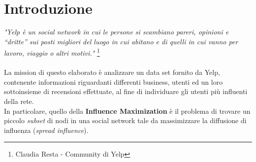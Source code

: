 
\chapter{Introduzione}
\textit{"Yelp è un social network in cui le persone si
scambiano pareri,  opinioni e “dritte” sui posti migliori del luogo in cui
abitano e di  quelli in cui vanno per lavoro, viaggio o altri motivi."}
\footnote{Claudia Resta - Community di Yelp}\\\\
La mission di questo elaborato è
analizzare un data set fornito da Yelp,  contenente informazioni riguardanti
differenti business, utenti ed un  loro sottoinsieme di recensioni effettuate,
al fine di individuare gli  utenti più influenti della rete.\\
 In particolare,
quello della \textbf{Influence Maximization} è il  problema di trovare un
piccolo \textit{subset} di nodi in una social  network tale da  massimizzare la
diffusione di influenza  (\textit{spread influence}).
